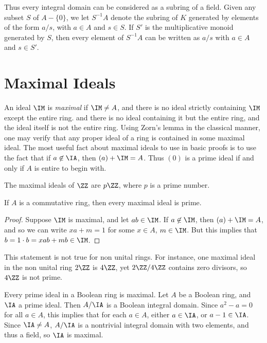 Thus every integral domain can be considered as a subring of a field. Given any subset $S$ of $A - \{ 0 \}$, we let $S^{-1}A$ denote the subring of $K$ generated by elements of the form $a/s$, with $a \in A$ and $s \in S$. If $S'$ is the multiplicative monoid generated by $S$, then every element of $S^{-1}A$ can be written as $a/s$ with $a \in A$ and $s \in S'$.

\section{Maximal Ideals}

An ideal $\IM$ is \emph{maximal} if $\IM \neq A$, and there is no ideal strictly containing $\IM$ except the entire ring. and there is no ideal containing it but the entire ring, and the ideal itself is not the entire ring. Using Zorn's lemma in the classical manner, one may verify that any proper ideal of a ring is contained in some maximal ideal. The most useful fact about maximal ideals to use in basic proofs is to use the fact that if $a \not \in \IA$, then $(a) + \IM = A$. Thus $(0)$ is a prime ideal if and only if $A$ is entire to begin with.

\begin{example}
    The maximal ideals of $\ZZ$ are $p \ZZ$, where $p$ is a prime number.
\end{example}

\begin{theorem}
    If $A$ is a commutative ring, then every maximal ideal is prime.
\end{theorem}
\begin{proof}
    Suppose $\IM$ is maximal, and let $ab \in \IM$. If $a \not \in \IM$, then $(a) + \IM = A$, and so we can write $xa + m = 1$ for some $x \in A$, $m \in \IM$. But this implies that $b = 1 \cdot b = xab + mb \in \IM$.
\end{proof}

\begin{remark}
    This statement is not true for non unital rings. For instance, one maximal ideal in the non unital ring $2 \ZZ$ is $4\ZZ$, yet $2\ZZ / 4\ZZ$ contains zero divisors, so $4\ZZ$ is not prime.
\end{remark}

\begin{example}
    Every prime ideal in a Boolean ring is maximal. Let $A$ be a Boolean ring, and $\IA$ a prime ideal. Then $A/\IA$ is a Boolean integral domain. Since $a^2 - a = 0$ for all $a \in A$, this implies that for each $a \in A$, either $a \in \IA$, or $a - 1 \in \IA$. Since $\IA \neq A$, $A/\IA$ is a nontrivial integral domain with two elements, and thus a field, so $\IA$ is maximal.
\end{example}

